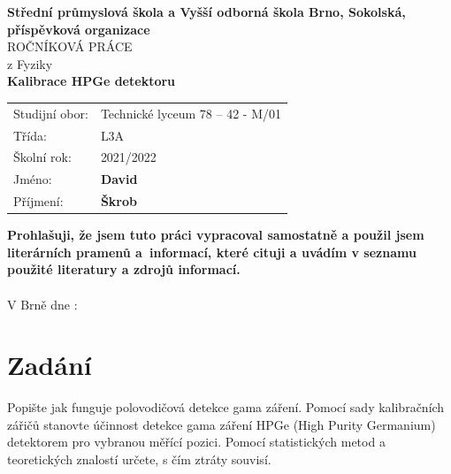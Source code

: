 \documentclass[12pt,a4paper]{article}
\begin{document}
\begin{spacing}{1.5}
\begin{titlepage}
	\begin{center}
		\large
		\textbf{Střední průmyslová škola a Vyšší odborná škola Brno, Sokolská,
			příspěvková organizace}\\
		\vspace*{4.5cm}
		\Huge
		ROČNÍKOVÁ PRÁCE\\
		z Fyziky\\
		\vspace*{4.5cm}
		\LARGE
		\textbf{Kalibrace HPGe detektoru}
		\vspace{1.5cm}
		
		\vfill
		\vspace{0.8cm}
		\large
		\begin{tabular}{p{} p{}}
			Studijní obor:& Technické lyceum 78 – 42 - M/01\\
			Třída:& L3A\\
			Školní rok:& 2021/2022\\
			Jméno:& \textbf{David}\\
			Příjmení:& \textbf{Škrob}\\
		\end{tabular}
	\end{center}
\end{titlepage}
\pagestyle{empty}
\vspace*{\fill}\hspace*{-20pt}
\textbf{Prohlašuji, že jsem tuto práci vypracoval samostatně a použil jsem literárních
	pramenů a~informací, které cituji a uvádím v seznamu použité literatury a zdrojů
	informací.}\\ 
\vspace{.2cm}\\%
\makeatother
	V Brně dne :
	\signaturedash[3cm]{}\hspace*{7cm}
\newpage
\tableofcontents
\newpage
\pagestyle{plain}
\setcounter{page}{3}
\section*{Zadání}
Popište jak funguje polovodičová detekce gama záření. Pomocí sady kalibračních zářičů stanovte účinnost detekce gama záření HPGe (High Purity Germanium) detektorem pro vybranou měřící pozici. Pomocí statistických metod a teoretických znalostí určete, s čím ztráty souvisí. %
\newpage
{}

\end{spacing}
\end{document}
